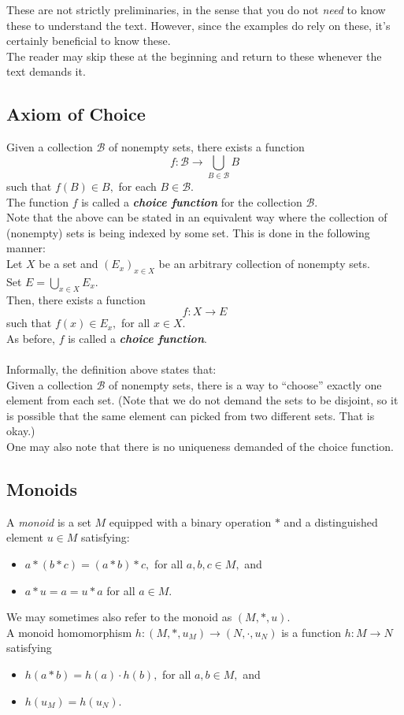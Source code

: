 These are not strictly preliminaries, in the sense that you do not \emph{need} to know these to understand the text. However, since the examples do rely on these, it's certainly beneficial to know these.\\
The reader may skip these at the beginning and return to these whenever the text demands it.
\subsection{Axiom of Choice}\label{axiomofchoice}
Given a collection $\mathcal{B}$ of nonempty sets, there exists a function
\begin{equation*} 
	f:\mathcal{B} \to \bigcup_{B \in \mathcal{B}}B
\end{equation*}
such that $f(B) \in B,$ for each $B \in \mathcal{B}.$\\
The function $f$ is called a \emph{\textbf{choice function}} for the collection $\mathcal{B}.$\\
Note that the above can be stated in an equivalent way where the collection of (nonempty) sets is being indexed by some set. This is done in the following manner:\\
Let $X$ be a set and $(E_x)_{x \in X}$ be an arbitrary collection of nonempty sets. \\
Set $E = \displaystyle\bigcup_{x \in X}E_x.$ \\
Then, there exists a function
\begin{equation*} 
 	f : X \to E
\end{equation*}
such that $f(x) \in E_x,$ for all $x \in X.$\\
As before, $f$ is called a \emph{\textbf{choice function}}.\\~\\
Informally, the definition above states that:\\
Given a collection $\mathcal{B}$ of nonempty sets, there is a way to ``choose'' exactly one element from each set. (Note that we do not demand the sets to be disjoint, so it is possible that the same element can picked from two different sets. That is okay.) \\
One may also note that there is no uniqueness demanded of the choice function.
\subsection{Monoids}
A \emph{monoid} is a set $M$ equipped with a binary operation $*$ and a distinguished element $u \in M$ satisfying:
\begin{itemize}
	\item $a*(b*c) = (a*b)*c,$ for all $a, b, c \in M,$ and
	\item $a*u = a = u*a$ for all $a \in M.$
\end{itemize}
We may sometimes also refer to the monoid as $(M, *, u).$\\
A monoid homomorphism $h:(M, *, u_M) \to (N, \cdot, u_N)$ is a function $h:M\to N$ satisfying
\begin{itemize}
	\item $h(a*b) = h(a)\cdot h(b),$ for all $a, b \in M,$ and
	\item $h(u_M) = h(u_N).$
\end{itemize}
